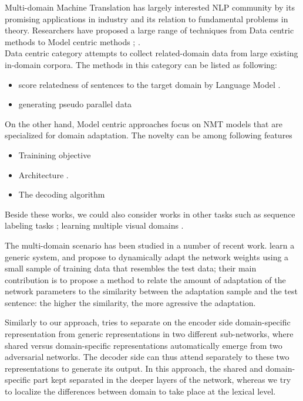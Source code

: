 \documentclass[11pt,a4paper]{article}
\newcommand{\fyTodo}[1]{\Todo[FY:]{\textcolor{orange}{#1}}}
\begin{document}
Multi-domain Machine Translation has largely interested NLP community by its promising applications in industry and its relation to fundamental problems in theory. Researchers have proposed a large range of techniques from Data centric methods to Model centric methods \cite{Chu18asurvey}; \cite{Chu2017comparison}.\\ Data centric category attempts to collect related-domain data from large existing in-domain corpora. The methods in this category can be listed as following:
\fyTodo{Organize refs}
\begin{itemize}
\item score relatedness of sentences to the target domain by Language Model \cite{Moore2010selection,Axelrod2011domain,Duh2013selection}.
\item generating pseudo parallel data \cite{Utiyama2003measure,Wang2016connecting,Wang2014neural}
\end{itemize}
On the other hand, Model centric approaches focus on NMT models that are specialized for domain adaptation. The novelty can be among following features
\begin{itemize}
\item Trainining objective \cite{Luong2015SNMT,Senrich2016Mono,Wang2017Instance,Chen2017Cost,Miceli2017Regularize,Zhang18sentence}
\item Architecture \cite{gulcehre2016monolingual,Zhang16topicinformed,Kobus17domaincontrol,Britz2017mixing,Biao2017CARENMT,Britz2017mixing,Thompson18freezing,Michel2018extreme}.
\item The decoding algorithm \cite{gulcehre2016monolingual,Khayrallah2017lattice}
\end{itemize}

Beside these works, we could also consider works in other tasks such as sequence labeling tasks \cite{Daume07frustratingly}; learning multiple visual domains \cite{Rebuffi2017Visual}.

The multi-domain scenario has been studied in a number of recent work. \citet{Farajian17multidomain} learn a generic system, and propose to dynamically adapt the network weights using a small sample of training data that resembles the test data; their main contribution is to propose a method to relate the amount of adaptation of the network parameters to the similarity between the adaptation sample and the test sentence: the higher the similarity, the more agressive the adaptation.

Similarly to our approach, \cite{Zeng18multidomain} tries to separate on the encoder side domain-specific representation from generic representations in two different sub-networks, where shared versus domain-specific representations automatically emerge from two adversarial networks. The decoder side can thus attend separately to these two representations to generate its output. In this approach, the shared and domain-specific part kept separated in the deeper layers of the network, whereas we try to localize the differences between domain to take place at the lexical level.
\end{document}

